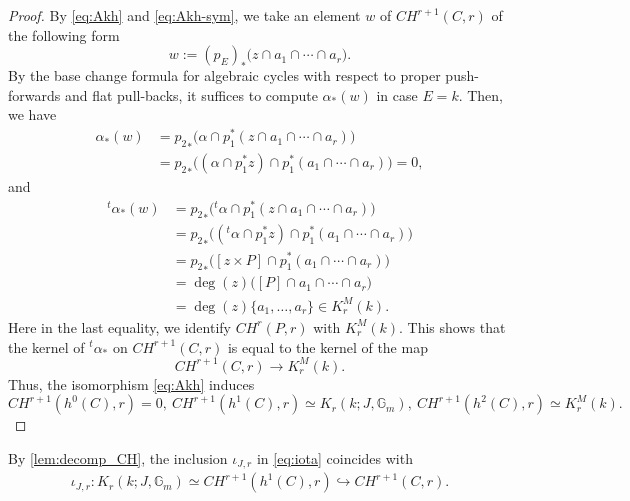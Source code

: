 \documentclass[a4paper,12pt]{amsart}
\numberwithin{equation}{section}
\theoremstyle{definition}
\newcommand{\Gm}{\mathbb{G}_{m}}
\begin{document}
\begin{proof}
    By \eqref{eq:Akh} and \eqref{eq:Akh-sym}, we take an element $w$ of $CH^{r+1}(C,r)$ of the following form
    $$
    w:=(p_E)_\ast\bigl(z\cap a_1\cap\cdots\cap a_r\bigr).
    $$
    By the base change formula for algebraic cycles with respect to proper push-forwards and flat pull-backs, it suffices to compute $\alpha_\ast(w)$ in case $E=k$.
    Then, we have
    \begin{align}
        \alpha_\ast(w)
        &={p_2}_\ast\bigl(\alpha\cap p_1^\ast(z\cap a_1\cap\cdots\cap a_r)\bigr)\\
        &={p_2}_\ast\bigl((\alpha\cap p_1^\ast z)\cap p_1^\ast(a_1\cap\cdots\cap a_r)\bigr)=0,
    \end{align}
    and
    \begin{align}
        {}^t\alpha_\ast(w)
        &={p_2}_\ast\bigl({}^t\alpha\cap p_1^\ast(z\cap a_1\cap\cdots\cap a_r)\bigr)\\
        &={p_2}_\ast\bigl(({}^t\alpha\cap p_1^\ast z)\cap p_1^\ast(a_1\cap\cdots\cap a_r)\bigr)\\
        &={p_2}_\ast\bigl([z\times P]\cap p_1^\ast(a_1\cap\cdots\cap a_r)\bigr)\\
        &=\deg(z)\bigl([P]\cap a_1\cap\cdots\cap a_r\bigr)\\
        &=\deg(z)\{a_1, \dots, a_r\}\in K_r^M(k).
    \end{align}
    Here in the last equality, we identify $CH^r(P,r)$ with $K^M_r(k)$.
    This shows that the kernel of ${}^t\alpha_\ast$ on $CH^{r+1}(C,r)$ is equal to the kernel of the map
    $$
    CH^{r+1}(C,r)\to K_r^M(k).
    $$
    Thus, the isomorphism \eqref{eq:Akh} induces
    $$
    CH^{r+1}(h^0(C),r)=0,\ CH^{r+1}(h^1(C),r)\simeq K_r(k;J,\Gm),\ CH^{r+1}(h^2(C),r)\simeq K_r^M(k).
    $$
\end{proof}
By \autoref{lem:decomp_CH}, the inclusion $\iota_{J,r}$ in \eqref{eq:iota} coincides with 
\begin{align}\label{eq:iota2}
    \iota_{J,r}: K_r(k;J,\Gm)\simeq CH^{r+1}(h^1(C),r)\hookrightarrow CH^{r+1}(C,r).
\end{align}
\end{document}
